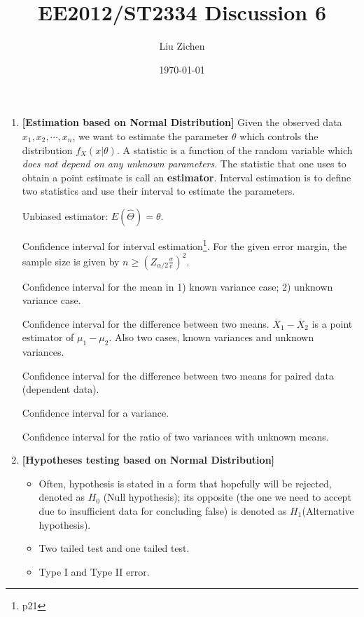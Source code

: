 \documentclass[a4paper]{article}
\title{EE2012/ST2334 Discussion 6}
\author{Liu Zichen}
\date{\today}
\begin{document}
\maketitle

\begin{enumerate}

\item
\textbf{[Estimation based on Normal Distribution]}
Given the observed data $x_{1}, x_{2}, \cdots, x_{n}$, we want to estimate the parameter $\theta$ which controls the distribution $f_{X}(x | \theta)$. A statistic is a function of the random variable which \textit{does not depend on any unknown parameters}. The statistic that one uses to obtain a point estimate is call an \textbf{estimator}. Interval estimation is to define two statistics and use their interval to estimate the parameters.

Unbiased estimator: $E(\widehat{\Theta})=\theta$.

Confidence interval for interval estimation\footnote{p21}. For the given error margin, the sample size is given by $n \geq\left(Z_{\alpha / 2} \frac{\sigma}{e}\right)^{2}$.

Confidence interval for the mean in 1) known variance case; 2) unknown variance case.

Confidence interval for the difference between two means. $\overline{X}_{1}-\overline{X}_{2}$ is a point estimator of $\mu_{1}-\mu_{2}$. Also two cases, known variances and unknown variances.

Confidence interval for the difference between two means for paired data (dependent data).

Confidence interval for a variance.

Confidence interval for the ratio of two variances with unknown means.

\item
\textbf{[Hypotheses testing based on Normal Distribution]}
\begin{itemize}
    \item Often, hypothesis is stated in a form that hopefully will be rejected, denoted as $H_0$ (Null hypothesis); its opposite (the one we need to accept due to insufficient data for concluding false) is denoted as $H_1$(Alternative hypothesis).
    
    \item Two tailed test and one tailed test.
    
    \item Type I and Type II error.
    

\end{itemize}
\end{enumerate}
\end{document}
